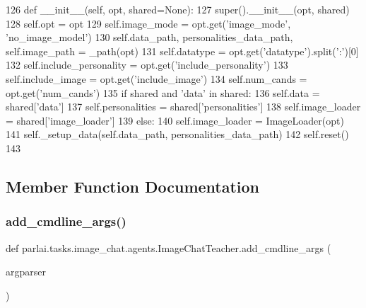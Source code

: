\begin{DoxyCode}
126     \textcolor{keyword}{def }\_\_init\_\_(self, opt, shared=None):
127         super().\_\_init\_\_(opt, shared)
128         self.opt = opt
129         self.image\_mode = opt.get(\textcolor{stringliteral}{'image\_mode'}, \textcolor{stringliteral}{'no\_image\_model'})
130         self.data\_path, personalities\_data\_path, self.image\_path = \_path(opt)
131         self.datatype = opt.get(\textcolor{stringliteral}{'datatype'}).split(\textcolor{stringliteral}{':'})[0]
132         self.include\_personality = opt.get(\textcolor{stringliteral}{'include\_personality'})
133         self.include\_image = opt.get(\textcolor{stringliteral}{'include\_image'})
134         self.num\_cands = opt.get(\textcolor{stringliteral}{'num\_cands'})
135         \textcolor{keywordflow}{if} shared \textcolor{keywordflow}{and} \textcolor{stringliteral}{'data'} \textcolor{keywordflow}{in} shared:
136             self.data = shared[\textcolor{stringliteral}{'data'}]
137             self.personalities = shared[\textcolor{stringliteral}{'personalities'}]
138             self.image\_loader = shared[\textcolor{stringliteral}{'image\_loader'}]
139         \textcolor{keywordflow}{else}:
140             self.image\_loader = ImageLoader(opt)
141             self.\_setup\_data(self.data\_path, personalities\_data\_path)
142         self.reset()
143 
\end{DoxyCode}


\subsection{Member Function Documentation}
\mbox{\label{classparlai_1_1tasks_1_1image__chat_1_1agents_1_1ImageChatTeacher_ab4741aa666881eb9170c9d92a8da1742}} 
\subsubsection{\texorpdfstring{add\+\_\+cmdline\+\_\+args()}{add\_cmdline\_args()}}
{\footnotesize\ttfamily def parlai.\+tasks.\+image\+\_\+chat.\+agents.\+Image\+Chat\+Teacher.\+add\+\_\+cmdline\+\_\+args (\begin{DoxyParamCaption}\item[{}]{argparser }\end{DoxyParamCaption})\hspace{0.3cm}{\ttfamily [static]}}



